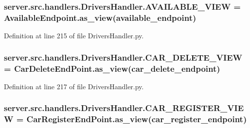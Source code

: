 \subsubsection[{\texorpdfstring{A\+V\+A\+I\+L\+A\+B\+L\+E\+\_\+\+V\+I\+EW}{AVAILABLE_VIEW}}]{\setlength{\rightskip}{0pt plus 5cm}server.\+src.\+handlers.\+Drivers\+Handler.\+A\+V\+A\+I\+L\+A\+B\+L\+E\+\_\+\+V\+I\+EW = Available\+Endpoint.\+as\+\_\+view(\textquotesingle{}available\+\_\+endpoint\textquotesingle{})}\hypertarget{namespaceserver_1_1src_1_1handlers_1_1_drivers_handler_ac8aaa47e84a448d1319186a424a08705}{}\label{namespaceserver_1_1src_1_1handlers_1_1_drivers_handler_ac8aaa47e84a448d1319186a424a08705}


Definition at line 215 of file Drivers\+Handler.\+py.

\subsubsection[{\texorpdfstring{C\+A\+R\+\_\+\+D\+E\+L\+E\+T\+E\+\_\+\+V\+I\+EW}{CAR_DELETE_VIEW}}]{\setlength{\rightskip}{0pt plus 5cm}server.\+src.\+handlers.\+Drivers\+Handler.\+C\+A\+R\+\_\+\+D\+E\+L\+E\+T\+E\+\_\+\+V\+I\+EW = Car\+Delete\+End\+Point.\+as\+\_\+view(\textquotesingle{}car\+\_\+delete\+\_\+endpoint\textquotesingle{})}\hypertarget{namespaceserver_1_1src_1_1handlers_1_1_drivers_handler_a8ca29fb02445457afdbe41bbea4b467a}{}\label{namespaceserver_1_1src_1_1handlers_1_1_drivers_handler_a8ca29fb02445457afdbe41bbea4b467a}


Definition at line 217 of file Drivers\+Handler.\+py.

\subsubsection[{\texorpdfstring{C\+A\+R\+\_\+\+R\+E\+G\+I\+S\+T\+E\+R\+\_\+\+V\+I\+EW}{CAR_REGISTER_VIEW}}]{\setlength{\rightskip}{0pt plus 5cm}server.\+src.\+handlers.\+Drivers\+Handler.\+C\+A\+R\+\_\+\+R\+E\+G\+I\+S\+T\+E\+R\+\_\+\+V\+I\+EW = Car\+Register\+End\+Point.\+as\+\_\+view(\textquotesingle{}car\+\_\+register\+\_\+endpoint\textquotesingle{})}\hypertarget{namespaceserver_1_1src_1_1handlers_1_1_drivers_handler_aef78289c84185700fe7afcde60dfeb34}{}\label{namespaceserver_1_1src_1_1handlers_1_1_drivers_handler_aef78289c84185700fe7afcde60dfeb34}



